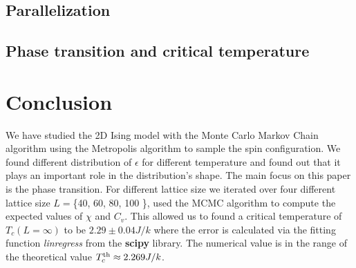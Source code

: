 \documentclass[english,notitlepage,reprint,nofootinbib]{revtex4-2}  %
\begin{document}
	\subsection{Parallelization}\label{subsec: dis parallelization}
	
	\subsection{Phase transition and critical temperature}\label{subsec: dis phase transition}
	
	\section{Conclusion}\label{sec:conclusion}
	We have studied the 2D Ising model with the Monte Carlo Markov Chain algorithm 
	using the Metropolis algorithm to sample the spin configuration. We found different 
	distribution of $\epsilon$ for different temperature and found out that it plays 
	an important role in the distribution's shape. The main focus on this paper is the 
	phase transition. For different lattice size we iterated over four different lattice 
	size $L=$\{40, 60, 80, 100 \}, used the MCMC algorithm to compute the expected values 
	of $\chi$ and $C_v$. This allowed us to found a critical temperature of $T_c(L=\infty)$
	to be $ 2.29 \pm 0.04 J/k $ where the error is calculated via the fitting function 
	\textit{linregress} from the \textbf{scipy} library. The numerical value is in the range
	of the theoretical value $T_{c}^{\rm th} \approx 2.269 J/k$.
	
	
	\onecolumngrid
	
	
	
	
\end{document}
